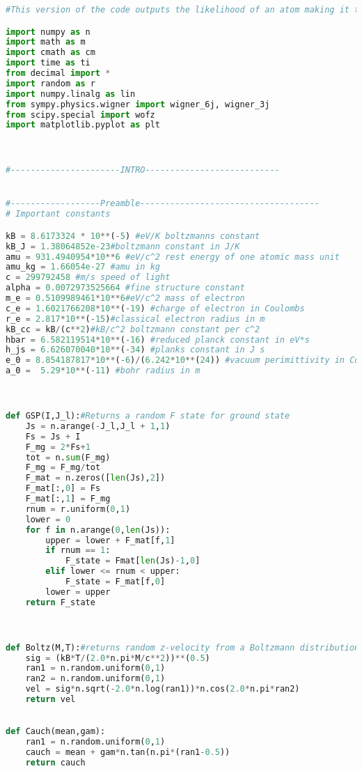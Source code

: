 {
\begin{lstlisting}[language=Python,breaklines]
#This version of the code outputs the likelihood of an atom making it to the LCR in the same ground state that it started in.

import numpy as n
import math as m
import cmath as cm
import time as ti
from decimal import *
import random as r
import numpy.linalg as lin
from sympy.physics.wigner import wigner_6j, wigner_3j
from scipy.special import wofz
import matplotlib.pyplot as plt



#----------------------INTRO---------------------------


#------------------Preamble------------------------------------
# Important constants

kB = 8.6173324 * 10**(-5) #eV/K boltzmanns constant
kB_J = 1.38064852e-23#boltzmann constant in J/K
amu = 931.4940954*10**6 #eV/c^2 rest energy of one atomic mass unit
amu_kg = 1.66054e-27 #amu in kg
c = 299792458 #m/s speed of light
alpha = 0.0072973525664 #fine structure constant
m_e = 0.5109989461*10**6#eV/c^2 mass of electron
c_e = 1.6021766208*10**(-19) #charge of electron in Coulombs
r_e = 2.817*10**(-15)#classical electron radius in m
kB_cc = kB/(c**2)#kB/c^2 boltzmann constant per c^2
hbar = 6.582119514*10**(-16) #reduced planck constant in eV*s
h_js = 6.626070040*10**(-34) #planks constant in J s
e_0 = 8.854187817*10**(-6)/(6.242*10**(24)) #vacuum perimittivity in Coulombs^2/eV*m
a_0 =  5.29*10**(-11) #bohr radius in m



def GSP(I,J_l):#Returns a random F state for ground state 
	Js = n.arange(-J_l,J_l + 1,1)
	Fs = Js + I
	F_mg = 2*Fs+1
	tot = n.sum(F_mg)
	F_mg = F_mg/tot
	F_mat = n.zeros([len(Js),2])
	F_mat[:,0] = Fs
	F_mat[:,1] = F_mg
	rnum = r.uniform(0,1)
	lower = 0
	for f in n.arange(0,len(Js)):
		upper = lower + F_mat[f,1]
		if rnum == 1:
			F_state = Fmat[len(Js)-1,0]
		elif lower <= rnum < upper:
			F_state = F_mat[f,0]
		lower = upper
	return F_state



def Boltz(M,T):#returns random z-velocity from a Boltzmann distribution (m/s)
	sig = (kB*T/(2.0*n.pi*M/c**2))**(0.5)
	ran1 = n.random.uniform(0,1)
	ran2 = n.random.uniform(0,1)
	vel = sig*n.sqrt(-2.0*n.log(ran1))*n.cos(2.0*n.pi*ran2)
	return vel

		
def Cauch(mean,gam):
	ran1 = n.random.uniform(0,1)
	cauch = mean + gam*n.tan(n.pi*(ran1-0.5))
	return cauch


\end{lstlisting}}
